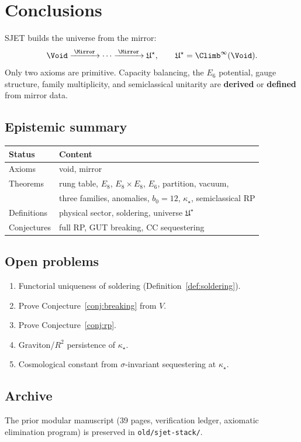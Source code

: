 \section{Conclusions}
\label{sec:conclusions}

SJET builds the universe from the mirror:
\begin{equation}
  \Void\xrightarrow{\;\Mirror\;}\cdots\xrightarrow{\;\Mirror\;}\mathfrak{U}^\star,
  \qquad
  \mathfrak{U}^\star=\Climb^\infty(\Void).
\end{equation}
Only two axioms are primitive. Capacity balancing, the $E_6$ potential,
gauge structure, family multiplicity, and semiclassical unitarity are
\textbf{derived} or \textbf{defined} from mirror data.

\subsection{Epistemic summary}

\begin{center}
\small
\begin{tabular}{@{}ll@{}}
\toprule
\textbf{Status} & \textbf{Content} \\
\midrule
Axioms & void, mirror \\
Theorems & rung table, $E_8$, $E_8\times E_8$, $E_6$, partition, vacuum, \\
 & three families, anomalies, $b_0=12$, $\kappa_\star$, semiclassical RP \\
Definitions & physical sector, soldering, universe $\mathfrak{U}^\star$ \\
Conjectures & full RP, GUT breaking, CC sequestering \\
\bottomrule
\end{tabular}
\end{center}

\subsection{Open problems}

\begin{enumerate}[label=\textbf{O\arabic*.},leftmargin=*]
  \item Functorial uniqueness of soldering (Definition~\ref{def:soldering}).
  \item Prove Conjecture~\ref{conj:breaking} from $V$.
  \item Prove Conjecture~\ref{conj:rp}.
  \item Graviton/$R^2$ persistence of $\kappa_\star$.
  \item Cosmological constant from $\sigma$-invariant sequestering at $\kappa_\star$.
\end{enumerate}

\subsection{Archive}

The prior modular manuscript (39 pages, verification ledger, axiomatic
elimination program) is preserved in \texttt{old/sjet-stack/}.